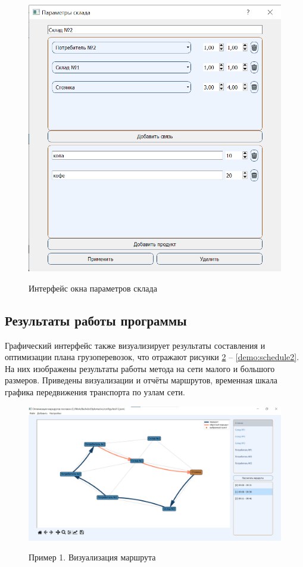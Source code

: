 \begin{figure}[hp]
	\begin{center}
		{\includegraphics[scale=0.8, angle=0, page=1]{img/warehouse_page.png}}
		\caption{Интерфейс окна параметров склада}
		\label{gui:warehouse}
	\end{center}
\end{figure}


\subsection{Результаты работы программы}
Графический интерфейс также визуализирует результаты составления и оптимизации плана грузоперевозок, что отражают рисунки \ref{demo:routes1} -- \ref{demo:schedule2}. На них изображены результаты работы метода на сети малого и большого размеров. Приведены визуализации и отчёты маршрутов, временная шкала графика передвижения транспорта по узлам сети.

\begin{figure}[h!]
	\begin{center}
		{\includegraphics[scale=0.5, angle=0, page=1]{img/demo_routes_1.png}}
		\caption{Пример 1. Визуализация маршрута}
		\label{demo:routes1}
	\end{center}
\end{figure}

